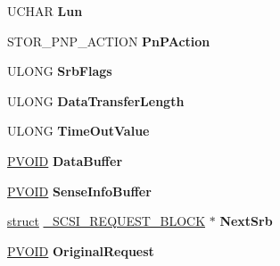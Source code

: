 \begin{DoxyCompactItemize}
U\+C\+H\+AR {\bfseries Lun}
\item 
\mbox{\label{struct___s_c_s_i___p_n_p___r_e_q_u_e_s_t___b_l_o_c_k_a4302ef70a2f6fb14f4ea7bdccdafa30c}} 
S\+T\+O\+R\+\_\+\+P\+N\+P\+\_\+\+A\+C\+T\+I\+ON {\bfseries Pn\+P\+Action}
\item 
\mbox{\label{struct___s_c_s_i___p_n_p___r_e_q_u_e_s_t___b_l_o_c_k_af35077be09549d2aa2ebea87ee0ea6f7}} 
U\+L\+O\+NG {\bfseries Srb\+Flags}
\item 
\mbox{\label{struct___s_c_s_i___p_n_p___r_e_q_u_e_s_t___b_l_o_c_k_a3d63dac80398316cb19fbf84b8b7ca41}} 
U\+L\+O\+NG {\bfseries Data\+Transfer\+Length}
\item 
\mbox{\label{struct___s_c_s_i___p_n_p___r_e_q_u_e_s_t___b_l_o_c_k_a07820c851751825569aa9123bddd6b0e}} 
U\+L\+O\+NG {\bfseries Time\+Out\+Value}
\item 
\mbox{\label{struct___s_c_s_i___p_n_p___r_e_q_u_e_s_t___b_l_o_c_k_ac2155a63f2d935bd655d3f15b738b38e}} 
\hyperlink{interfacevoid}{P\+V\+O\+ID} {\bfseries Data\+Buffer}
\item 
\mbox{\label{struct___s_c_s_i___p_n_p___r_e_q_u_e_s_t___b_l_o_c_k_a37c080a790212d484bd00b89d435aba6}} 
\hyperlink{interfacevoid}{P\+V\+O\+ID} {\bfseries Sense\+Info\+Buffer}
\item 
\mbox{\label{struct___s_c_s_i___p_n_p___r_e_q_u_e_s_t___b_l_o_c_k_a32002ef4391d081cb150f07507fd857a}} 
\hyperlink{interfacestruct}{struct} \hyperlink{struct___s_c_s_i___r_e_q_u_e_s_t___b_l_o_c_k}{\+\_\+\+S\+C\+S\+I\+\_\+\+R\+E\+Q\+U\+E\+S\+T\+\_\+\+B\+L\+O\+CK} $\ast$ {\bfseries Next\+Srb}
\item 
\mbox{\label{struct___s_c_s_i___p_n_p___r_e_q_u_e_s_t___b_l_o_c_k_ae939014d6e7ac03fd854daedfc2d2236}} 
\hyperlink{interfacevoid}{P\+V\+O\+ID} {\bfseries Original\+Request}

\end{DoxyCompactItemize}
